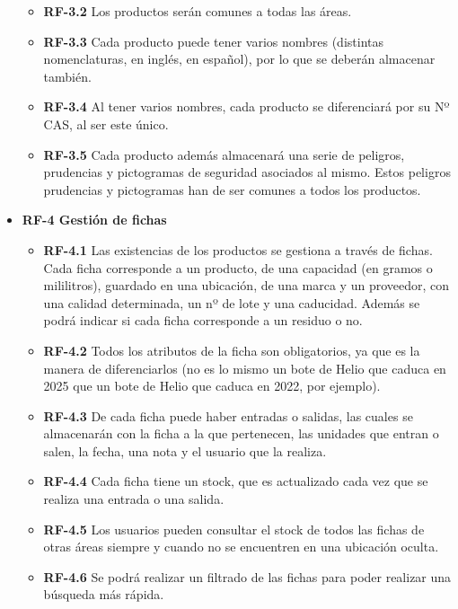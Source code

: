 \begin{itemize}
\begin{itemize}
	\item\textbf{ RF-3.2} Los productos serán comunes a todas las áreas.
	
	\item\textbf{ RF-3.3} Cada producto puede tener varios nombres (distintas nomenclaturas, en inglés, en español), por lo que se deberán almacenar también.
	
	\item\textbf{ RF-3.4} Al tener varios nombres, cada producto se diferenciará por su Nº CAS, al ser este único.
	
	\item\textbf{ RF-3.5} Cada producto además almacenará una serie de peligros, prudencias y pictogramas de seguridad asociados al mismo. Estos peligros prudencias y pictogramas han de ser comunes a todos los productos.
	
	\end{itemize}
	
\item \textbf{RF-4 Gestión de fichas}
	\begin{itemize}
	\item\textbf{ RF-4.1} Las existencias de los productos se gestiona a través de fichas. Cada ficha corresponde a un producto, de una capacidad (en gramos o mililitros), guardado en una 	ubicación, de una marca y un proveedor, con una calidad determinada, un nº de lote y una caducidad. Además se podrá indicar si cada ficha corresponde a un residuo o no. 
	
	\item\textbf{ RF-4.2} Todos los atributos de la ficha son obligatorios, ya que es la manera de diferenciarlos (no es lo mismo un bote de Helio que caduca en 2025 que un bote de Helio que caduca en 2022, por ejemplo).

	\item\textbf{ RF-4.3} De cada ficha puede haber entradas o salidas, las cuales se almacenarán con la ficha a la que pertenecen, las unidades que entran o salen, la fecha, una nota y el usuario que la realiza.
	
	\item\textbf{ RF-4.4} Cada ficha tiene un stock, que es actualizado cada vez que se realiza una entrada o una salida.
	
	\item\textbf{ RF-4.5} Los usuarios pueden consultar el stock de todos las fichas de otras áreas siempre y cuando no se encuentren en una ubicación oculta.
	
	\item\textbf{ RF-4.6} Se podrá realizar un filtrado de las fichas para poder realizar una búsqueda más rápida.
	

\end{itemize}
\end{itemize}
